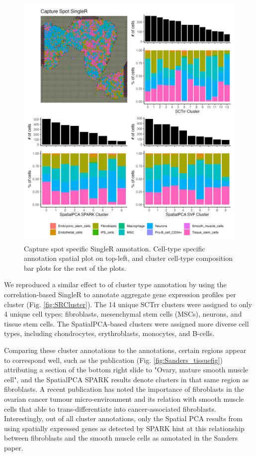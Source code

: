 \documentclass{article}
\begin{document}
\begin{figure}[h!]
    \centering
    \includegraphics[width=\textwidth]{images/SRSpot_D_GTFB1170_SmallCellOvarianCancer_pw_sq.png}
    \caption{Capture spot specific SingleR annotation. Cell-type specific annotation spatial plot on top-left, and cluster cell-type composition bar plots for the rest of the plots.}
    \label{fig:SRSpot}
\end{figure}

We reproduced a similar effect to \citet{sanders_small_2022} of cluster type annotation by using the correlation-based SingleR to annotate aggregate gene expression profiles per cluster (Fig. \ref{fig:SRCluster}). The 14 unique SCTrr clusters were assigned to only 4 unique cell types: fibroblasts, mesenchymal stem cells (MSCs), neurons, and tissue stem cells. The SpatialPCA-based clusters were assigned more diverse cell types, including chondrocytes, erythroblasts, monocytes, and B-cells. 

Comparing these cluster annotations to the \citet{sanders_small_2022} annotations, certain regions appear to correspond well, such as the publication (Fig. \ref{fig:Sanders_tissuefig}) attributing a section of the bottom right slide to "Ovary, mature smooth muscle cell", and the SpatialPCA SPARK results denote clusters in that same region as fibroblasts. A recent publication\citep{zhang_role_2022} has noted the importance of fibroblasts in the ovarian cancer tumour micro-environment and its relation with smooth muscle cells that able to trans-differentiate into cancer-associated fibroblasts. Interestingly, out of all cluster annotations, only the Spatial PCA results from using spatially expressed genes as detected by SPARK hint at this relationship between fibroblasts and the smooth muscle cells as annotated in the Sanders paper.
\end{document}
